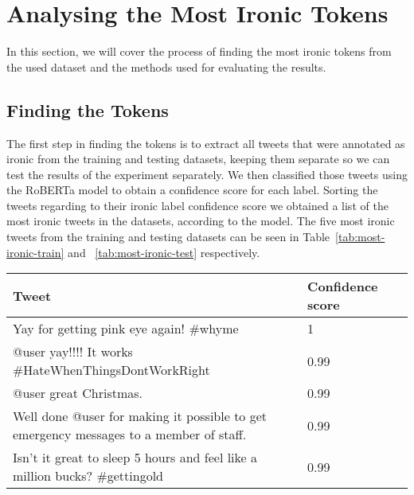 \documentclass[10pt, a4paper]{article}
\begin{document}
\section{Analysing the Most Ironic Tokens}

In this section, we will cover the process of finding the most ironic tokens from the used dataset and the methods used for evaluating the results.

\subsection{Finding the Tokens}

The first step in finding the tokens is to extract all tweets that were annotated as ironic from the training and testing datasets, keeping them separate so we can test the results of the experiment separately.
We then classified those tweets using the RoBERTa model to obtain a confidence score for each label.
Sorting the tweets regarding to their ironic label confidence score we obtained a list of the most ironic tweets in the datasets, according to the model.
The five most ironic tweets from the training and testing datasets can be seen in Table~\ref{tab:most-ironic-train} and ~\ref{tab:most-ironic-test} respectively.

\begin{table*}
\caption{Most Ironic Tweets in the Training Set}
\label{tab:most-ironic-train}
\begin{center}
\begin{tabular}{llr}
\toprule
Tweet & Confidence score\\
\midrule
Yay for getting pink eye again!  \#whyme                                                & 1 \\
@user yay!!!! It works  \#HateWhenThingsDontWorkRight                                   & 0.99 \\
@user great Christmas.                                                                  & 0.99 \\
Well done @user for making it possible to get emergency messages to a member of staff.  & 0.99 \\
Isn't it great to sleep 5 hours and feel like a million bucks?  \#gettingold            & 0.99 \\
\bottomrule
\end{tabular}
\end{center}
\end{table*}
\end{document}
